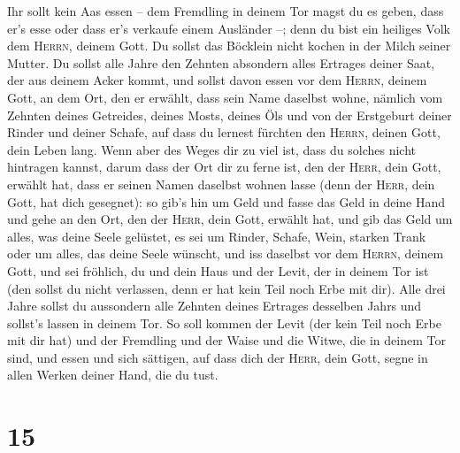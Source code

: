  Ihr sollt kein Aas essen -- dem Fremdling in deinem Tor
magst du es geben, dass er's esse oder dass er's verkaufe einem
Ausländer --; denn du bist ein heiliges Volk dem \textsc{Herrn}, deinem
Gott. Du sollst das Böcklein nicht kochen in der Milch seiner Mutter.
 Du sollst alle Jahre den Zehnten absondern alles
Ertrages deiner Saat, der aus deinem Acker kommt,  und
sollst davon essen vor dem \textsc{Herrn}, deinem Gott, an dem Ort, den
er erwählt, dass sein Name daselbst wohne, nämlich vom Zehnten deines
Getreides, deines Mosts, deines Öls und von der Erstgeburt deiner Rinder
und deiner Schafe, auf dass du lernest fürchten den \textsc{Herrn},
deinen Gott, dein Leben lang.  Wenn aber des Weges dir zu
viel ist, dass du solches nicht hintragen kannst, darum dass der Ort dir
zu ferne ist, den der \textsc{Herr}, dein Gott, erwählt hat, dass er
seinen Namen daselbst wohnen lasse (denn der \textsc{Herr}, dein Gott,
hat dich gesegnet):  so gib's hin um Geld und fasse das
Geld in deine Hand und gehe an den Ort, den der \textsc{Herr}, dein
Gott, erwählt hat,  und gib das Geld um alles, was deine
Seele gelüstet, es sei um Rinder, Schafe, Wein, starken Trank oder um
alles, das deine Seele wünscht, und iss daselbst vor dem \textsc{Herrn},
deinem Gott, und sei fröhlich, du und dein Haus  und der
Levit, der in deinem Tor ist (den sollst du nicht verlassen, denn er hat
kein Teil noch Erbe mit dir).  Alle drei Jahre sollst du
aussondern alle Zehnten deines Ertrages desselben Jahrs und sollst's
lassen in deinem Tor.  So soll kommen der Levit (der kein
Teil noch Erbe mit dir hat) und der Fremdling und der Waise und die
Witwe, die in deinem Tor sind, und essen und sich sättigen, auf dass
dich der \textsc{Herr}, dein Gott, segne in allen Werken deiner Hand,
die du tust.

\hypertarget{section-14}{%
\section{15}\label{section-14}}

